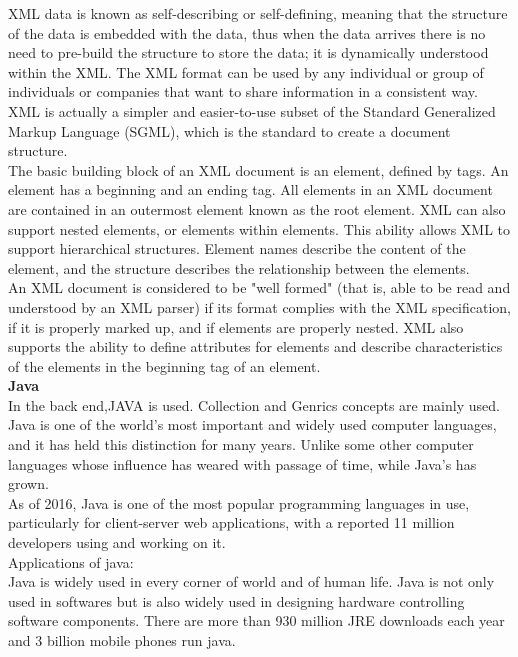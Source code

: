 XML data is known as self-describing or self-defining, meaning that the structure of the data is embedded with the data, thus when the data arrives there is no need to pre-build the structure to store the data; it is dynamically understood within the XML. The XML format can be used by any individual or group of individuals or companies that want to share information in a consistent way. XML is actually a simpler and easier-to-use subset of the Standard Generalized Markup Language (SGML), which is the standard to create a document structure.\\
The basic building block of an XML document is an element, defined by tags. An element has a beginning and an ending tag. All elements in an XML document are contained in an outermost element known as the root element. XML can also support nested elements, or elements within elements. This ability allows XML to support hierarchical structures. Element names describe the content of the element, and the structure describes the relationship between the elements.\\
An XML document is considered to be "well formed" (that is, able to be read and understood by an XML parser) if its format complies with the XML specification, if it is properly marked up, and if elements are properly nested. XML also supports the ability to define attributes for elements and describe characteristics of the elements in the beginning tag of an element.\\

\textbf{Java}\\
In the back end,JAVA is used. Collection and Genrics concepts are mainly used. Java is one of the world's most important and widely used computer languages, and it has held this distinction for many years. Unlike some other computer languages whose influence has weared with passage of time, while Java's has grown.\\

As of 2016, Java is one of the most popular programming languages in use, particularly for client-server web applications, with a reported 11 million developers using and working on it.\\
Applications of java:\\
Java is widely used in every corner of world and of human life. Java is not only used in softwares but is also widely used in designing hardware controlling software components. There are more than 930 million JRE downloads each year and 3 billion mobile phones run java.\\


